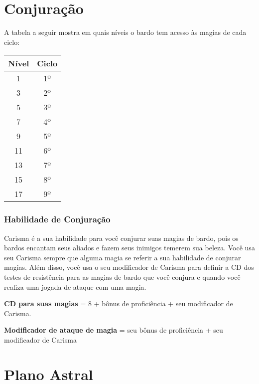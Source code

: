 \documentclass{RPG_Adventure}[2021/10/20]
\begin{document}
\begin{multicols}{2}
\section*{Conjuração}%

A tabela a seguir mostra em quais níveis o bardo tem acesso às magias de cada
ciclo:

\begin{center}
\begin{tabular}{|||c||c|||}
    \hline
    \textbf{Nível} & \textbf{Ciclo} \\
    \hline
    1 & 1º \\
    \hline
    3 & 2º \\
    \hline
    5 & 3º \\
    \hline
    7 & 4º \\
    \hline
    9 & 5º \\
    \hline
    11 & 6º \\
    \hline
    13 & 7º \\
    \hline
    15 & 8º \\
    \hline
    17 & 9º \\
    \hline
\end{tabular}
\end{center}

\subsubsection*{Habilidade de Conjuração}%

Carisma é a sua habilidade para você conjurar suas magias de bardo, pois os
bardos encantam seus aliados e fazem seus inimigos temerem sua beleza.
Você usa seu Carisma sempre que alguma magia se referir a sua habilidade de
conjurar magias. Além disso, você usa o seu modificador de Carisma para definir
a CD dos testes de resistência para as magias de bardo que você conjura e
quando você realiza uma jogada de ataque com uma magia.

\begin{center}
\textbf{CD para suas magias} = 8 + bônus de proficiência + seu modificador de
Carisma. \nl

\textbf{Modificador de ataque de magia} = seu bônus de proficiência + seu
modificador de Carisma
\end{center}

\section*{Plano Astral}%


\end{multicols}
\end{document}
